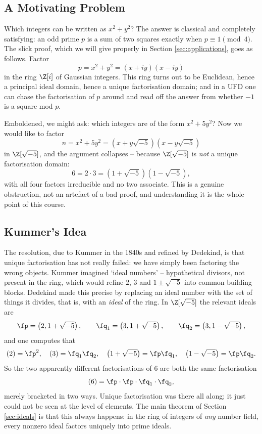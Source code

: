 \subsection{A Motivating Problem}

Which integers can be written as $x^2+y^2$? The answer is classical and completely satisfying: an odd prime $p$ is a sum of two squares exactly when $p \equiv 1 \pmod 4$. The slick proof, which we will give properly in Section \ref{sec:applications}, goes as follows. Factor
$$p = x^2+y^2 = (x+iy)(x-iy)$$
in the ring $\Z[i]$ of Gaussian integers. This ring turns out to be Euclidean, hence a principal ideal domain, hence a unique factorisation domain; and in a UFD one can chase the factorisation of $p$ around and read off the answer from whether $-1$ is a square mod $p$.

Emboldened, we might ask: which integers are of the form $x^2+5y^2$? Now we would like to factor
$$n = x^2+5y^2 = \left(x+y\sqrt{-5}\right)\left(x-y\sqrt{-5}\right)$$
in $\Z[\sqrt{-5}]$, and the argument collapses -- because $\Z[\sqrt{-5}]$ is \emph{not} a unique factorisation domain:
$$6 = 2 \cdot 3 = \left(1+\sqrt{-5}\right)\left(1-\sqrt{-5}\right),$$
with all four factors irreducible and no two associate. This is a genuine obstruction, not an artefact of a bad proof, and understanding it is the whole point of this course.

\subsection{Kummer's Idea}

The resolution, due to Kummer in the 1840s and refined by Dedekind, is that unique factorisation has not really failed: we have simply been factoring the wrong objects. Kummer imagined `ideal numbers' -- hypothetical divisors, not present in the ring, which would refine $2$, $3$ and $1\pm\sqrt{-5}$ into common building blocks. Dedekind made this precise by replacing an ideal number with the set of things it divides, that is, with an \emph{ideal} of the ring. In $\Z[\sqrt{-5}]$ the relevant ideals are
$$\fp = \left(2, 1+\sqrt{-5}\right), \qquad \fq_1 = \left(3,1+\sqrt{-5}\right), \qquad \fq_2 = \left(3, 1-\sqrt{-5}\right),$$
and one computes that
$$(2) = \fp^2, \quad (3) = \fq_1\fq_2, \quad \left(1+\sqrt{-5}\right) = \fp\fq_1, \quad \left(1-\sqrt{-5}\right) = \fp\fq_2.$$
So the two apparently different factorisations of $6$ are both the same factorisation
$$(6) = \fp\cdot\fp\cdot\fq_1\cdot\fq_2,$$
merely bracketed in two ways. Unique factorisation was there all along; it just could not be seen at the level of elements. The main theorem of Section \ref{sec:ideals} is that this always happens: in the ring of integers of \emph{any} number field, every nonzero ideal factors uniquely into prime ideals.

